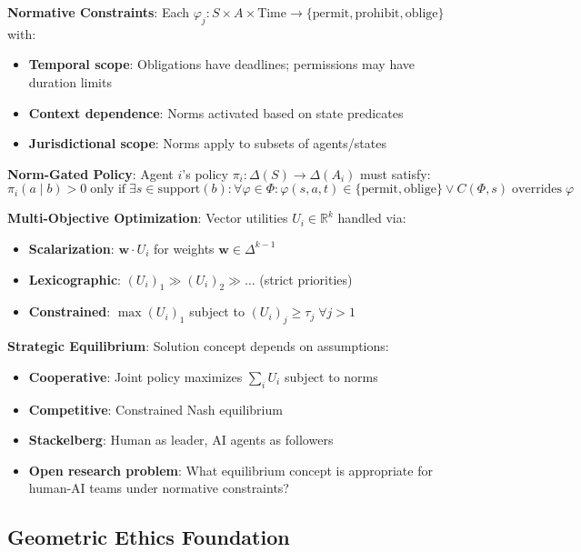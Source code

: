 \documentclass[conference]{IEEEtran}
\begin{document}
\textbf{Normative Constraints}: Each $\varphi_j: S \times A \times \text{Time} \to \{\text{permit}, \text{prohibit}, \text{oblige}\}$ with:
\begin{itemize}
\item \textbf{Temporal scope}: Obligations have deadlines; permissions may have duration limits
\item \textbf{Context dependence}: Norms activated based on state predicates
\item \textbf{Jurisdictional scope}: Norms apply to subsets of agents/states
\end{itemize}

\textbf{Norm-Gated Policy}: Agent $i$'s policy $\pi_i: \Delta(S) \to \Delta(A_i)$ must satisfy:
\begin{equation}
\pi_i(a \mid b) > 0 \;\text{only if}\; \exists s \in \text{support}(b): \forall \varphi \in \Phi: \varphi(s, a, t) \in \{\text{permit}, \text{oblige}\} \lor C(\Phi, s) \;\text{overrides}\; \varphi
\end{equation}

\textbf{Multi-Objective Optimization}: Vector utilities $U_i \in \mathbb{R}^k$ handled via:
\begin{itemize}
\item \textbf{Scalarization}: $\mathbf{w} \cdot U_i$ for weights $\mathbf{w} \in \Delta^{k-1}$
\item \textbf{Lexicographic}: $(U_i)_1 \gg (U_i)_2 \gg \ldots$ (strict priorities)
\item \textbf{Constrained}: $\max (U_i)_1$ subject to $(U_i)_j \geq \tau_j\;\forall j > 1$
\end{itemize}

\textbf{Strategic Equilibrium}: Solution concept depends on assumptions:
\begin{itemize}
\item \textbf{Cooperative}: Joint policy maximizes $\sum_i U_i$ subject to norms
\item \textbf{Competitive}: Constrained Nash equilibrium
\item \textbf{Stackelberg}: Human as leader, AI agents as followers
\item \textbf{Open research problem}: What equilibrium concept is appropriate for human-AI teams under normative constraints?
\end{itemize}

\subsection{Geometric Ethics Foundation}
\end{document}
